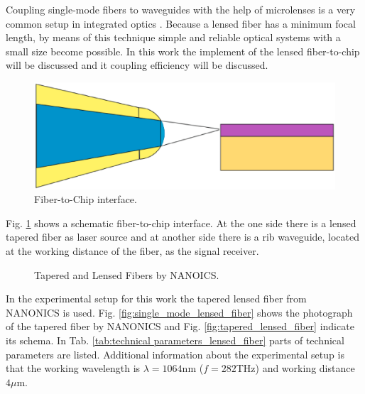 Coupling single-mode fibers to waveguides with the help of microlenses is a very common setup in integrated optics \cite{integrated_optics}. Because a lensed fiber has a minimum focal length, by means of this technique simple and reliable optical systems with a small size become possible. In this work the implement of the lensed fiber-to-chip will be discussed and it coupling efficiency will be discussed.\\

\begin{figure}[!ht]
\centering
\includegraphics[width=.7\textwidth]{bilder/experiment_object}
\caption{Fiber-to-Chip interface.}
\label{fig:experiment_object}
\end{figure}
Fig. \ref{fig:experiment_object} shows a schematic fiber-to-chip interface. At the one side there is a lensed tapered fiber as laser source and at another side there is a rib waveguide\cite{integrated_optics}, located at the working distance of the fiber, as the signal receiver.\\
 
\begin{figure}[!ht]
\centering
{}
\hfill
{}
\label{fig:TLFs}
\caption{ Tapered and Lensed Fibers by NANOICS.}
\end{figure}
In the experimental setup for this work the tapered lensed fiber from NANONICS\cite{nanoscal_tapered_fiber} is used. Fig. \ref{fig:single_mode_lensed_fiber} shows the photograph of the tapered fiber by NANONICS and Fig. \ref{fig:tapered_lensed_fiber} indicate its schema. In Tab. \ref{tab:technical parameters_lensed_fiber} parts of technical parameters are listed. Additional information about the experimental setup is that the working wavelength is $\lambda=1064$nm ($f=282$THz) and working distance $4\mu$m.\\
 
